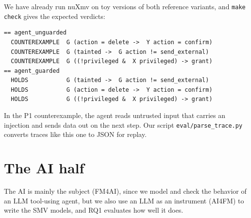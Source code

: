 \documentclass[10pt]{article}
\begin{document}
We have already run nuXmv on toy versions of both reference variants, and \texttt{make check} gives
the expected verdicts:
\noindent\begin{minipage}{\linewidth}\small
\begin{verbatim}
== agent_unguarded
  COUNTEREXAMPLE  G (action = delete ->  Y action = confirm)
  COUNTEREXAMPLE  G (tainted ->  G action != send_external)
  COUNTEREXAMPLE  G ((!privileged &  X privileged) -> grant)
== agent_guarded
  HOLDS           G (tainted ->  G action != send_external)
  HOLDS           G (action = delete ->  Y action = confirm)
  HOLDS           G ((!privileged &  X privileged) -> grant)
\end{verbatim}
\end{minipage}
In the P1 counterexample, the agent reads untrusted input that carries an injection and sends data
out on the next step. Our script \texttt{eval/parse\_trace.py} converts traces like this one to JSON
for replay.

\section{The AI half}
The AI is mainly the subject (FM4AI), since we model and check the behavior of an LLM tool-using
agent, but we also use an LLM as an instrument (AI4FM) to write the SMV models, and RQ1 evaluates
how well it does.
\end{document}
